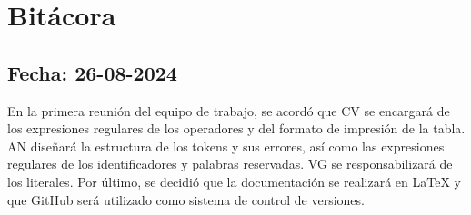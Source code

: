 \documentclass[a4paper,12pt]{article}
\begin{document}
\section*{Bitácora}

\subsection*{Fecha: 26-08-2024}
\begin{flushleft}
    \hspace*{2em} En la primera reunión del equipo de trabajo,
    se acordó que CV se encargará de los expresiones regulares
    de los operadores y del formato de impresión de la tabla.
    AN diseñará la estructura de los tokens y sus errores, 
    así como las expresiones regulares de los identificadores
    y palabras reservadas. VG se responsabilizará de los 
    literales. Por último, se decidió que la documentación se 
    realizará en LaTeX y que GitHub será utilizado como 
    sistema de control de versiones.
\end{flushleft}
\end{document}
